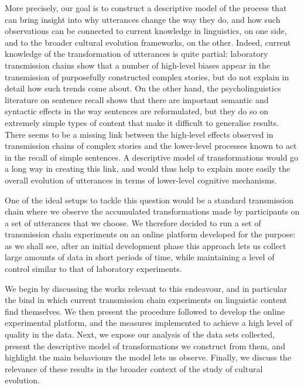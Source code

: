 More precisely, our goal is to construct a descriptive model of the
process that can bring insight into why utterances change the way they
do, and how such observations can be connected to current knowledge in
linguistics, on one side, and to the broader cultural evolution
frameworks, on the other. Indeed, current knowledge of the
transformation of utterances is quite partial: laboratory transmission
chains show that a number of high-level biases appear in the
transmission of purposefully constructed complex stories, but do not
explain in detail how such trends come about. On the other hand, the
psycholinguistics literature on sentence recall shows that there are
important semantic and syntactic effects in the way sentences are
reformulated, but they do so on extremely simple types of content that
make it difficult to generalise results. There seems to be a missing
link between the high-level effects observed in
transmission chains of complex stories and the lower-level processes known to act in the recall of simple sentences. A descriptive
model of transformations would go a long way in creating this link, and would thus help to explain more easily the overall evolution of utterances in terms of lower-level cognitive mechanisms.

One of the ideal setups to tackle this question would be a standard transmission
chain where we observe the accumulated transformations made by
participants on a set of utterances that we choose. 
We therefore decided to run a set of transmission chain experiments on an online platform developed for the purpose: as we shall see, after an initial development phase this approach lets us collect large amounts of data in short periods of time, while maintaining a level of control similar to that of laboratory experiments.

We begin by discussing the works relevant to this endeavour, and in
particular the bind in which current transmission chain experiments on
linguistic content find themselves. We then present the procedure
followed to develop the online experimental platform, and the measures
implemented to achieve a high level of quality in the data. Next, we
expose our analysis of the data sets collected, present the descriptive
model of transformations we construct from them, and highlight the main
behaviours the model lets us observe. Finally, we discuss the relevance
of these results in the broader context of the study of cultural
evolution.

